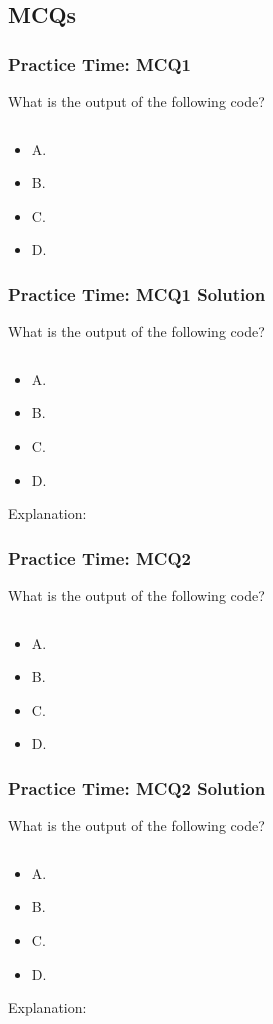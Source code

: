 \documentclass{beamer}
\begin{document}
\subsection{MCQs}
\begin{frame}[fragile]
    \frametitle{Practice Time: MCQ1}
    What is the output of the following code?
    \begin{verbatim}
    \end{verbatim}
    \begin{itemize}
        \item A.
        \item B.
        \item C.
        \item D.
    \end{itemize}
\end{frame}
\begin{frame}[fragile]
    \frametitle{Practice Time: MCQ1 Solution}
    What is the output of the following code?
    \begin{verbatim}
    \end{verbatim}
    \begin{itemize}
        \item A.
        \item B.
        \item C.
        \item D.
    \end{itemize}

    Explanation:
\end{frame}
\begin{frame}[fragile]
    \frametitle{Practice Time: MCQ2}
    What is the output of the following code?
    \begin{verbatim}
    \end{verbatim}
    \begin{itemize}
        \item A.
        \item B.
        \item C.
        \item D.
    \end{itemize}
\end{frame}
\begin{frame}[fragile]
    \frametitle{Practice Time: MCQ2 Solution}
    What is the output of the following code?
    \begin{verbatim}
    \end{verbatim}
    \begin{itemize}
        \item A.
        \item B.
        \item C.
        \item D.
    \end{itemize}

    Explanation:
\end{frame}
\end{document}
